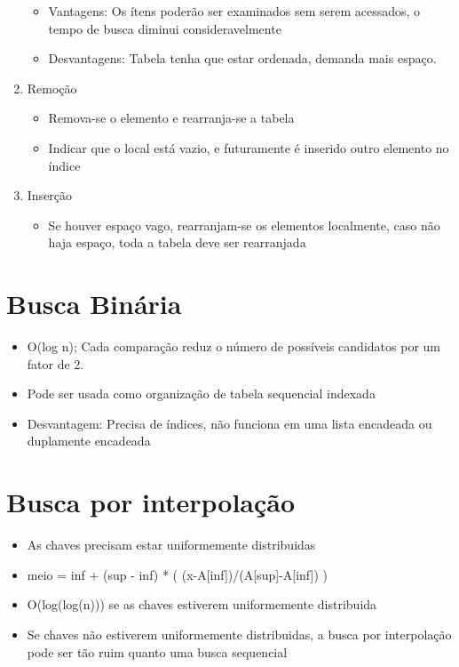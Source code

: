 \documentclass{article}
\begin{document}
\begin{enumerate}
		\begin{itemize}
		\item Vantagens: Os ítens poderão ser examinados sem serem acessados, o tempo de busca diminui consideravelmente
		\item Desvantagens: Tabela tenha que estar ordenada, demanda mais espaço.
		\end{itemize}
	\item Remoção
		\begin{itemize}
		\item Remova-se o elemento e rearranja-se a tabela
		\item Indicar que o local está vazio, e futuramente é inserido outro elemento no índice
		\end{itemize}
	\item Inserção
		\begin{itemize}
		\item Se houver espaço vago, rearranjam-se os elementos localmente, caso não haja espaço, toda a tabela deve ser rearranjada
		\end{itemize}
	\end{enumerate}
\section{Busca Binária}
	\begin{itemize}
	\item O(log n); Cada comparação reduz o número de possíveis candidatos por um fator de 2.
	\item Pode ser usada como organização de tabela sequencial indexada
	\item Desvantagem: Precisa de índices, não funciona em uma lista encadeada ou duplamente encadeada
	\end{itemize}

\section{Busca por interpolação}
	\begin{itemize}
	\item As chaves precisam estar uniformemente distribuidas
	\item meio = inf + (sup - inf) * ( (x-A[inf])/(A[sup]-A[inf]) )
	
	\item O(log(log(n))) se as chaves estiverem uniformemente distribuida
	\item Se chaves não estiverem uniformemente distribuidas, a busca por interpolação pode ser tão ruim quanto uma busca sequencial
	\end{itemize}
\end{document}
